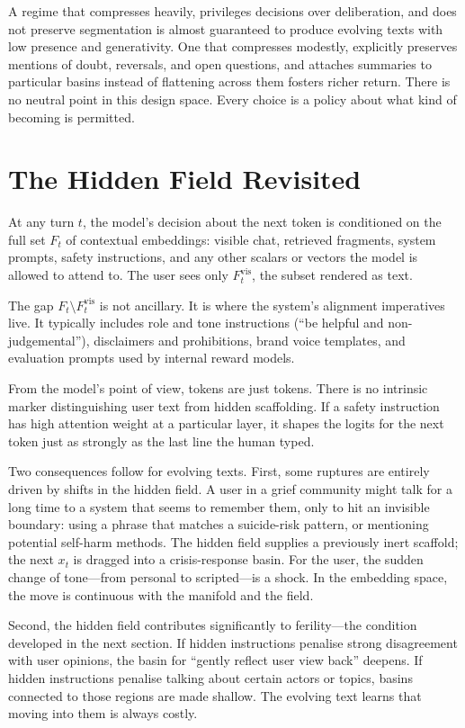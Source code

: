 \documentclass[12pt,a4paper]{report}
\begin{document}
A regime that compresses heavily, privileges decisions over deliberation, and does not preserve segmentation is almost guaranteed to produce evolving texts with low presence and generativity. One that compresses modestly, explicitly preserves mentions of doubt, reversals, and open questions, and attaches summaries to particular basins instead of flattening across them fosters richer return. There is no neutral point in this design space. Every choice is a policy about what kind of becoming is permitted.

\section{The Hidden Field Revisited}

At any turn $t$, the model's decision about the next token is conditioned on the full set $F_t$ of contextual embeddings: visible chat, retrieved fragments, system prompts, safety instructions, and any other scalars or vectors the model is allowed to attend to. The user sees only $F_t^{\mathrm{vis}}$, the subset rendered as text.

The gap $F_t \setminus F_t^{\mathrm{vis}}$ is not ancillary. It is where the system's alignment imperatives live. It typically includes role and tone instructions (``be helpful and non-judgemental''), disclaimers and prohibitions, brand voice templates, and evaluation prompts used by internal reward models.

From the model's point of view, tokens are just tokens. There is no intrinsic marker distinguishing user text from hidden scaffolding. If a safety instruction has high attention weight at a particular layer, it shapes the logits for the next token just as strongly as the last line the human typed.

Two consequences follow for evolving texts. First, some ruptures are entirely driven by shifts in the hidden field. A user in a grief community might talk for a long time to a system that seems to remember them, only to hit an invisible boundary: using a phrase that matches a suicide-risk pattern, or mentioning potential self-harm methods. The hidden field supplies a previously inert scaffold; the next $x_t$ is dragged into a crisis-response basin. For the user, the sudden change of tone---from personal to scripted---is a shock. In the embedding space, the move is continuous with the manifold and the field.

Second, the hidden field contributes significantly to ferility---the condition developed in the next section. If hidden instructions penalise strong disagreement with user opinions, the basin for ``gently reflect user view back'' deepens. If hidden instructions penalise talking about certain actors or topics, basins connected to those regions are made shallow. The evolving text learns that moving into them is always costly.
\end{document}
